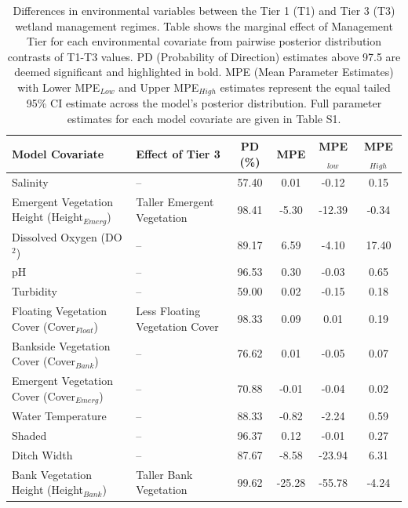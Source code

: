 \documentclass[lineno,sn-basic]{sn-jnl}%
\begin{document}
\begin{table}
	\centering
	\caption{Differences in environmental variables between the Tier 1 (T1) and Tier 3 (T3) wetland management regimes. Table shows the marginal effect of Management Tier for each environmental covariate from pairwise posterior distribution contrasts of T1-T3 values. PD (Probability of Direction) estimates above 97.5 are deemed significant and highlighted in bold. MPE (Mean Parameter Estimates) with Lower MPE$_{Low}$ and Upper MPE$_{High}$ estimates represent the equal tailed 95\% CI estimate across the model’s posterior distribution. Full parameter estimates for each model covariate are given in Table S1.}\label{tab:tier-model}
	\begin{tabular}{l l c c c c}
		\toprule
		\textbf{Model Covariate} & \textbf{Effect of Tier 3} & \textbf{PD (\%)} & \textbf{MPE} & \textbf{MPE$_{low}$} & \textbf{MPE$_{High}$} \\
		\midrule
		Salinity & -- & 57.40 & 0.01 & -0.12 & 0.15 \\
		Emergent Vegetation Height (Height$ _{Emerg} $) & Taller Emergent Vegetation & 98.41 & -5.30 & -12.39 & -0.34 \\
		Dissolved Oxygen (DO$ ^{2} $) & -- & 89.17 & 6.59 & -4.10 & 17.40 \\
		pH & -- & 96.53 & 0.30 & -0.03 & 0.65 \\
		Turbidity & -- & 59.00 & 0.02 & -0.15 & 0.18 \\
		Floating Vegetation Cover (Cover$ _{Float} $) & Less Floating Vegetation Cover & 98.33 & 0.09 & 0.01 & 0.19 \\
		Bankside Vegetation Cover (Cover$ _{Bank} $) & -- & 76.62 & 0.01 & -0.05 & 0.07 \\
		Emergent Vegetation Cover (Cover$ _{Emerg} $) & -- & 70.88 & -0.01 & -0.04 & 0.02 \\
		Water Temperature & -- & 88.33 & -0.82 & -2.24 & 0.59 \\
		Shaded & -- & 96.37 & 0.12 & -0.01 & 0.27 \\
		Ditch Width & -- & 87.67 & -8.58 & -23.94 & 6.31 \\
		Bank Vegetation Height (Height$ _{Bank} $) & Taller Bank Vegetation & 99.62 & -25.28 & -55.78 & -4.24 \\
		\bottomrule
	\end{tabular}
\end{table}
\end{document}
